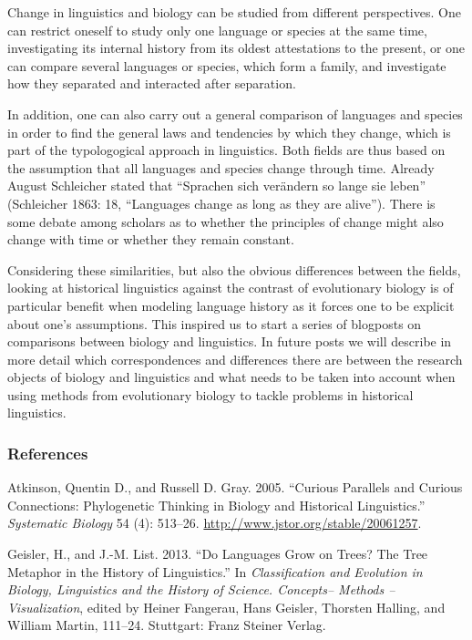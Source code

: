 \documentclass[
  a4paper,
  14pt,
  oneside,
  tablecaptionabove
]{scrbook}
\begin{document}
Change in linguistics and biology can be studied from different
perspectives. One can restrict oneself to study only one language or
species at the same time, investigating its internal history from its
oldest attestations to the present, or one can compare several languages
or species, which form a family, and investigate how they separated and
interacted after separation.

In addition, one can also carry out a general comparison of languages
and species in order to find the general laws and tendencies by which
they change, which is part of the typologogical approach in linguistics.
Both fields are thus based on the assumption that all languages and
species change through time. Already August Schleicher stated that
\enquote{Sprachen sich verändern so lange sie leben} (Schleicher 1863:
18, \enquote{Languages change as long as they are alive}). There is some
debate among scholars as to whether the principles of change might also
change with time or whether they remain constant.

Considering these similarities, but also the obvious differences between
the fields, looking at historical linguistics against the contrast of
evolutionary biology is of particular benefit when modeling language
history as it forces one to be explicit about one's assumptions. This
inspired us to start a series of blogposts on comparisons between
biology and linguistics. In future posts we will describe in more detail
which correspondences and differences there are between the research
objects of biology and linguistics and what needs to be taken into
account when using methods from evolutionary biology to tackle problems
in historical linguistics.

\subsubsection*{References}

\nopagebreak\hangindent=0.7cm {\small  Atkinson, Quentin D., and Russell D. Gray. 2005. \enquote{Curious
Parallels and Curious Connections: Phylogenetic Thinking in Biology and
Historical Linguistics.} \emph{Systematic Biology} 54 (4): 513--26.
\url{http://www.jstor.org/stable/20061257}. }

\nopagebreak\hangindent=0.7cm {\small  Geisler, H., and J.-M. List. 2013. \enquote{Do Languages Grow on
Trees? The Tree Metaphor in the History of Linguistics.} In
\emph{Classification and Evolution in Biology, Linguistics and the
History of Science. Concepts-- Methods -- Visualization}, edited by
Heiner Fangerau, Hans Geisler, Thorsten Halling, and William Martin,
111--24. Stuttgart: Franz Steiner Verlag.}
\end{document}
